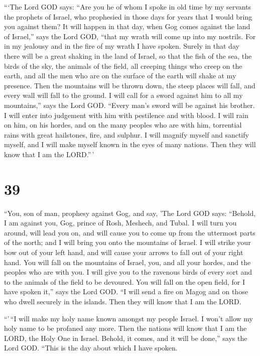  ```The Lord GOD says: ``Are you he of whom I spoke in old
time by my servants the prophets of Israel, who prophesied in those days
for years that I would bring you against them?  It will
happen in that day, when Gog comes against the land of Israel,'' says
the Lord GOD, ``that my wrath will come up into my nostrils.
 For in my jealousy and in the fire of my wrath I have
spoken. Surely in that day there will be a great shaking in the land of
Israel,  so that the fish of the sea, the birds of the sky,
the animals of the field, all creeping things who creep on the earth,
and all the men who are on the surface of the earth will shake at my
presence. Then the mountains will be thrown down, the steep places will
fall, and every wall will fall to the ground.  I will call
for a sword against him to all my mountains,'' says the Lord GOD.
``Every man's sword will be against his brother.  I will
enter into judgement with him with pestilence and with blood. I will
rain on him, on his hordes, and on the many peoples who are with him,
torrential rains with great hailstones, fire, and sulphur. 
I will magnify myself and sanctify myself, and I will make myself known
in the eyes of many nations. Then they will know that I am the
LORD.''\,'

\hypertarget{section-37}{%
\section{39}\label{section-37}}

 ``You, son of man, prophesy against Gog, and say, 'The Lord
GOD says: ``Behold, I am against you, Gog, prince of Rosh, Meshech, and
Tubal.  I will turn you around, will lead you on, and will
cause you to come up from the uttermost parts of the north; and I will
bring you onto the mountains of Israel.  I will strike your
bow out of your left hand, and will cause your arrows to fall out of
your right hand.  You will fall on the mountains of Israel,
you, and all your hordes, and the peoples who are with you. I will give
you to the ravenous birds of every sort and to the animals of the field
to be devoured.  You will fall on the open field, for I have
spoken it,'' says the Lord GOD.  ``I will send a fire on
Magog and on those who dwell securely in the islands. Then they will
know that I am the LORD.

 ``'\,``I will make my holy name known amongst my people
Israel. I won't allow my holy name to be profaned any more. Then the
nations will know that I am the LORD, the Holy One in Israel.
 Behold, it comes, and it will be done,'' says the Lord GOD.
``This is the day about which I have spoken.

